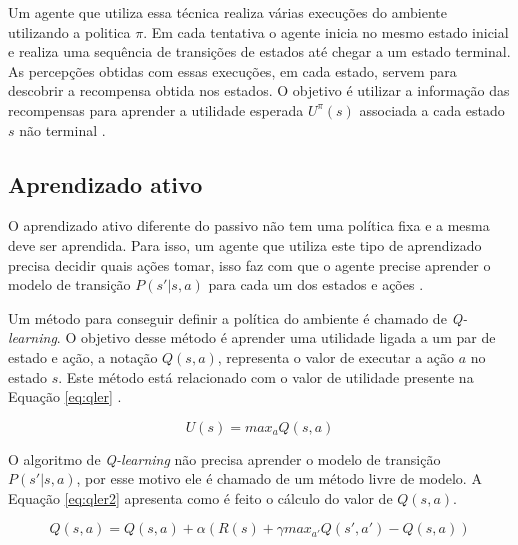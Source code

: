 Um agente que utiliza essa técnica realiza várias execuções do ambiente utilizando a politica $\pi$. Em cada tentativa o agente inicia no mesmo estado inicial e realiza uma sequência de transições de estados até chegar a um estado terminal. As percepções obtidas com essas execuções, em cada estado, servem para descobrir a recompensa obtida nos estados. O objetivo é utilizar a informação das recompensas para aprender a utilidade esperada $U^{\pi}(s)$ associada a cada estado $s$ não terminal \cite{intelligence2003modern}. 

\subsection{Aprendizado ativo}

O aprendizado ativo diferente do passivo não tem uma política fixa e a mesma deve ser aprendida. Para isso, um agente que utiliza este tipo de aprendizado precisa decidir quais ações tomar, isso faz com que o agente precise aprender o modelo de transição $P(s' | s, a)$ para cada um dos estados e ações \cite{intelligence2003modern}. 

Um método para conseguir definir a política do ambiente é chamado de \textit{Q-learning}. O objetivo desse método é aprender uma utilidade ligada a um par de estado e ação, a notação $Q(s, a)$, representa o valor de executar a ação $a$ no estado $s$. Este método está relacionado com o valor de utilidade presente na Equação \ref{eq:qler} \cite{intelligence2003modern}.

\begin{equation}
\label{eq:qler}	
	U(s) =  max_{a} Q(s, a)
\end{equation}

O algoritmo de \textit{Q-learning} não precisa aprender o modelo de transição $P(s' | s, a)$, por esse motivo ele é chamado de um método livre de modelo. A Equação \ref{eq:qler2} apresenta como é feito o cálculo do valor de $Q(s, a)$.

\begin{equation}
\label{eq:qler2}	
Q(s, a) = Q(s, a) + \alpha (R(s) + \gamma max_{a'} Q(s', a') - Q(s, a))
\end{equation}

